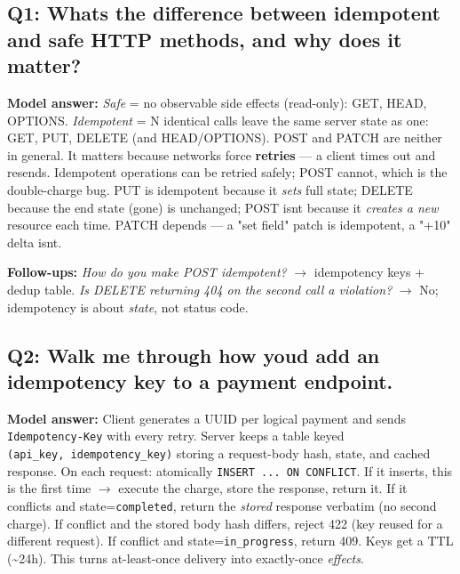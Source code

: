 \documentclass[11pt]{article}
\begin{document}
\subsection{Q1: What\textquotesingle s the difference between idempotent and safe HTTP methods, and why does it matter?}\label{q1-whats-the-difference-between-idempotent-and-safe-http-methods-and-why-does-it-matter}

\textbf{Model answer:} \emph{Safe} = no observable side effects (read-only): GET, HEAD, OPTIONS. \emph{Idempotent} = N identical calls leave the same server state as one: GET, PUT, DELETE (and HEAD/OPTIONS). POST and PATCH are neither in general. It matters because networks force \textbf{retries} --- a client times out and resends. Idempotent operations can be retried safely; POST cannot, which is the double-charge bug. PUT is idempotent because it \emph{sets} full state; DELETE because the end state (gone) is unchanged; POST isn\textquotesingle t because it \emph{creates a new} resource each time. PATCH depends --- a "set field" patch is idempotent, a "+10" delta isn\textquotesingle t.

\textbf{Follow-ups:} \emph{How do you make POST idempotent?} \(\rightarrow\) idempotency keys + dedup table. \emph{Is DELETE returning 404 on the second call a violation?} \(\rightarrow\) No; idempotency is about \emph{state}, not status code.

\subsection{Q2: Walk me through how you\textquotesingle d add an idempotency key to a payment endpoint.}\label{q2-walk-me-through-how-youd-add-an-idempotency-key-to-a-payment-endpoint}

\textbf{Model answer:} Client generates a UUID per logical payment and sends \texttt{Idempotency-Key} with every retry. Server keeps a table keyed \texttt{(api\_key,\ idempotency\_key)} storing a request-body hash, state, and cached response. On each request: atomically \texttt{INSERT\ ...\ ON\ CONFLICT}. If it inserts, this is the first time \(\rightarrow\) execute the charge, store the response, return it. If it conflicts and state=\texttt{completed}, return the \emph{stored} response verbatim (no second charge). If conflict and the stored body hash differs, reject 422 (key reused for a different request). If conflict and state=\texttt{in\_progress}, return 409. Keys get a TTL (\textasciitilde24h). This turns at-least-once delivery into exactly-once \emph{effects}.
\end{document}

